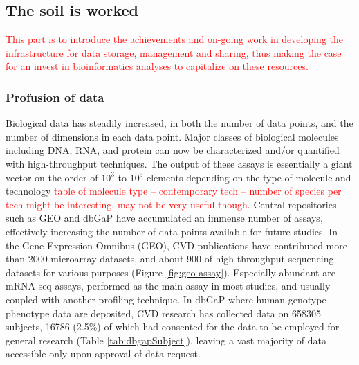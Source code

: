 \documentclass[letter]{bioinfo}
\newcommand{\comment}[1]{\textcolor{red}{#1}}
\begin{document}
\subsection{The soil is worked}

\comment{This part is to introduce the achievements and on-going work in developing the infrastructure for data storage, management and sharing, thus making the case for an invest in bioinformatics analyses to capitalize on these resources.}


\subsubsection{Profusion of data}

Biological data has steadily increased, in both the number of data points, and the number of dimensions in each data point.
Major classes of biological molecules including DNA, RNA, and protein can now be characterized and/or quantified with high-throughput techniques. The output of these assays is essentially a giant vector on the order of $10^3$ to $10^5$ elements depending on the type of molecule and technology \comment{table of molecule type -- contemporary tech -- number of species per tech might be interesting. may not be very useful though}. Central repositories such as GEO and dbGaP have accumulated an immense number of assays, effectively increasing the number of data points available for future studies.
In the Gene Expression Omnibus (GEO), CVD publications have contributed more than 2000 microarray datasets, and about 900 of high-throughput sequencing datasets for various purposes (Figure \ref{fig:geo-assay}). Especially abundant are mRNA-seq assays, performed as the main assay in most studies, and usually coupled with another profiling technique. In dbGaP where human genotype-phenotype data are deposited, CVD research has collected data on 658305 subjects, 16786 (2.5\%) of which had consented for the data to be employed for general research (Table \ref{tab:dbgapSubject}), leaving a vast majority of data accessible only upon approval of data request.

\end{document}
